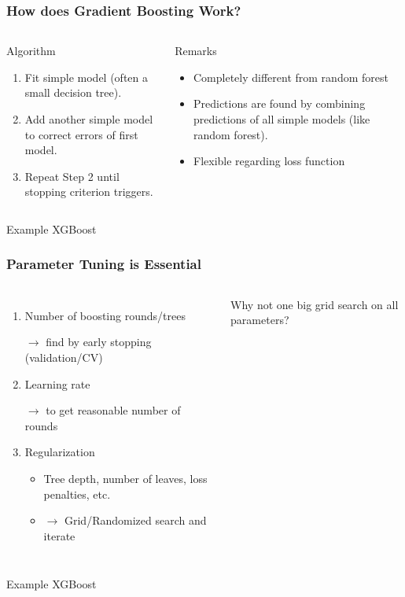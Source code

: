\documentclass[
    utf8,
    aspectratio=169
]{beamer}  %
\begin{document}
\begin{frame}
	\frametitle{How does Gradient Boosting Work?}
	\begin{columns}[onlytextwidth]
		\begin{block}{Algorithm}
			\begin{enumerate}
				\item Fit simple model (often a small decision tree).
				\item Add another simple model to correct errors of first model.
				\item Repeat Step 2 until stopping criterion triggers.
			\end{enumerate}
		\end{block}
		\begin{alertblock}{Remarks}
			\begin{itemize}
				\item Completely different from random forest
				\item Predictions are found by combining predictions of all simple models (like random forest).
				\item Flexible regarding loss function
			\end{itemize}
		\end{alertblock}
	\end{columns}

	\vfill

	\begin{exampleblock}{\centering Example XGBoost}
	\end{exampleblock}
\end{frame}

\begin{frame}
	\frametitle{Parameter Tuning is Essential}
	\begin{columns}[onlytextwidth]
		\begin{enumerate}
			\item Number of boosting rounds/trees 
			
			$\rightarrow$ find by early stopping (validation/CV)
			\item Learning rate 
			
			$\rightarrow$ to get reasonable number of rounds
			\item Regularization
				\begin{itemize}
					\item Tree depth, number of leaves, loss penalties, etc.
					\item $\rightarrow$ Grid/Randomized search and iterate
				\end{itemize}
		\end{enumerate}
		\begin{alertblock}{Why not one big grid search on all parameters?}
		\end{alertblock}
	\end{columns}

	\vfill
	
	\begin{exampleblock}{\centering Example XGBoost}
	\end{exampleblock}
\end{frame}
\end{document}
